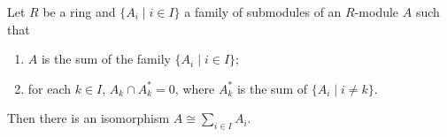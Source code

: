 Let $R$ be a ring and $\{A_i \mid i \in I\}$ a family of submodules of an $R$-module $A$ such that
\begin{enumerate}
\item[(i)] $A$ is the sum of the family $\{A_i \mid i \in I\}$;
\item[(ii)] for each $k \in I$, $A_k \cap A_k^* = 0$, where $A_k^*$ is the sum of $\{A_i \mid i \neq k\}$.
\end{enumerate}
Then there is an isomorphism $A \cong \sum_{i \in I} A_i$.
